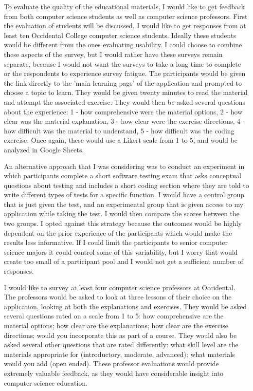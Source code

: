 \documentclass[10pt,twocolumn]{article}
\begin{document}
To evaluate the quality of the educational materials, I would like to get feedback from both computer science students 
as well as computer science professors. First the evaluation of students will be discussed.  I would like to get responses from at least ten Occidental 
College computer science students. Ideally these students would be different from the ones evaluating usability. I 
could choose to combine these aspects of the survey, but I would rather have these surveys remain separate, because I 
would not want the surveys to take a long time to complete or the respondents to experience survey fatigue. The 
participants would be given the link directly to the 'main learning page' of the application and prompted to choose a 
topic to learn. They would be given twenty minutes to read the material and attempt the associated exercise. They would 
then be asked several questions about the experience: 1 - how comprehensive were the material options, 2 - how clear was 
the material explanation, 3 - how clear were the exercise directions, 4 - how difficult was the material to understand, 
5 - how difficult was the coding exercise. Once again, these would use a Likert scale from 1 to 5, and would be analyzed 
in Google Sheets. 

An alternative approach that I was considering was to conduct an experiment in which participants 
complete a short software testing exam that asks conceptual questions about testing and includes a short coding section 
where they are told to write different types of tests for a specific function. I would have a control group that is just 
given the test, and an experimental group that is given access to my application while taking the test. I would then 
compare the scores between the two groups. I opted against this strategy because the outcomes would be highly dependent 
on the prior experience of the participants which would make the results less informative. If I could limit the 
participants to senior computer science majors it could control some of this variability, but I worry that would create 
too small of a participant pool and I would not get a sufficient number of responses. 

I would like to survey at least four computer science professors at Occidental. The professors would be asked to look at 
three lessons of their choice on the application, looking at both the explanations and exercises. They would be asked 
several questions rated on a scale from 1 to 5: how comprehensive are the material options; how clear are the 
explanations; how clear are the exercise directions; would you incorporate this as part of a course. They would also be 
asked several other questions that are rated 
differently: what skill level are the materials appropriate for (introductory, moderate, advanced); what materials would 
you add (open ended). These professor evaluations would provide extremely valuable feedback, as they would have 
considerable insight into computer science education. 
\end{document}
